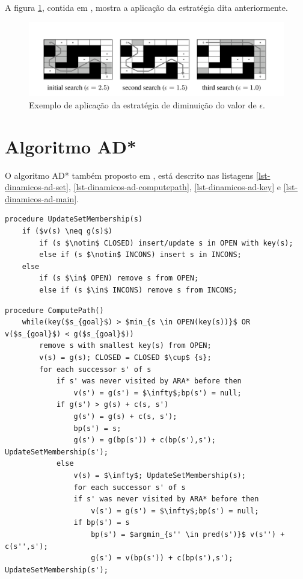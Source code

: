 A figura \ref{fig-ara-exemplo}, contida em , mostra a aplicação da estratégia dita anteriormente.

\begin{figure}[H]
\centering
\includegraphics[width=.80\textwidth]{figuras/ara-3} 
\caption{Exemplo de aplicação da estratégia de diminuição do valor de $\epsilon$.}
\label{fig-ara-exemplo}
\end{figure}
\section{Algoritmo AD*}
\label{sec-dinamicos-ad}

O algoritmo AD* também proposto em , está descrito nas listagens \ref{lst-dinamicos-ad-set}, \ref{lst-dinamicos-ad-computepath}, \ref{lst-dinamicos-ad-key} e \ref{lst-dinamicos-ad-main}.

\begin{lstlisting}[mathescape, label=lst-dinamicos-ad-set, caption=Algoritmo AD* - função para determinar o conjunto ao qual vértice pertencerá, float=htpb]
procedure UpdateSetMembership(s)
	if ($v(s) \neq g(s)$)
		if (s $\notin$ CLOSED) insert/update s in OPEN with key(s);
		else if (s $\notin$ INCONS) insert s in INCONS;
	else
		if (s $\in$ OPEN) remove s from OPEN;
		else if (s $\in$ INCONS) remove s from INCONS;
\end{lstlisting}

\begin{lstlisting}[mathescape, label=lst-dinamicos-ad-computepath, caption=Algoritmo AD* - função de cálculo de caminho, float=htpb]
procedure ComputePath()
	while(key($s_{goal}$) > $min_{s \in OPEN(key(s))}$ OR v($s_{goal}$) < g($s_{goal}$)) 
		remove s with smallest key(s) from OPEN;
		v(s) = g(s); CLOSED = CLOSED $\cup$ {s};
		for each successor s' of s
			if s' was never visited by ARA* before then
				v(s') = g(s') = $\infty$;bp(s') = null;
			if g(s') > g(s) + c(s, s')
				g(s') = g(s) + c(s, s');
				bp(s') = s;
				g(s') = g(bp(s')) + c(bp(s'),s'); UpdateSetMembership(s');
			else
				v(s) = $\infty$; UpdateSetMembership(s);
				for each successor s' of s
				if s' was never visited by ARA* before then
					v(s') = g(s') = $\infty$;bp(s') = null;
				if bp(s') = s
					bp(s') = $argmin_{s'' \in pred(s')}$ v(s'') + c(s'',s');
					g(s') = v(bp(s')) + c(bp(s'),s'); UpdateSetMembership(s');
\end{lstlisting}

